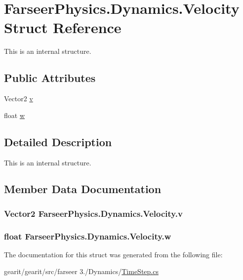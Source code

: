 \hypertarget{struct_farseer_physics_1_1_dynamics_1_1_velocity}{\section{Farseer\+Physics.\+Dynamics.\+Velocity Struct Reference}
\label{struct_farseer_physics_1_1_dynamics_1_1_velocity}
}


This is an internal structure.  


\subsection*{Public Attributes}
\begin{DoxyCompactItemize}
\item 
Vector2 \hyperlink{struct_farseer_physics_1_1_dynamics_1_1_velocity_a8f87946dc78a07a21932cee9d5d1338d}{v}
\item 
float \hyperlink{struct_farseer_physics_1_1_dynamics_1_1_velocity_ab03f2a1dd47a539d9d72adab72f145db}{w}
\end{DoxyCompactItemize}


\subsection{Detailed Description}
This is an internal structure. 

\subsection{Member Data Documentation}
\hypertarget{struct_farseer_physics_1_1_dynamics_1_1_velocity_a8f87946dc78a07a21932cee9d5d1338d}{
\subsubsection[{v}]{\setlength{\rightskip}{0pt plus 5cm}Vector2 Farseer\+Physics.\+Dynamics.\+Velocity.\+v}}\label{struct_farseer_physics_1_1_dynamics_1_1_velocity_a8f87946dc78a07a21932cee9d5d1338d}
\hypertarget{struct_farseer_physics_1_1_dynamics_1_1_velocity_ab03f2a1dd47a539d9d72adab72f145db}{
\subsubsection[{w}]{\setlength{\rightskip}{0pt plus 5cm}float Farseer\+Physics.\+Dynamics.\+Velocity.\+w}}\label{struct_farseer_physics_1_1_dynamics_1_1_velocity_ab03f2a1dd47a539d9d72adab72f145db}


The documentation for this struct was generated from the following file\+:\begin{DoxyCompactItemize}
\item 
gearit/gearit/src/farseer 3./\+Dynamics/\hyperlink{_time_step_8cs}{Time\+Step.\+cs}\end{DoxyCompactItemize}
